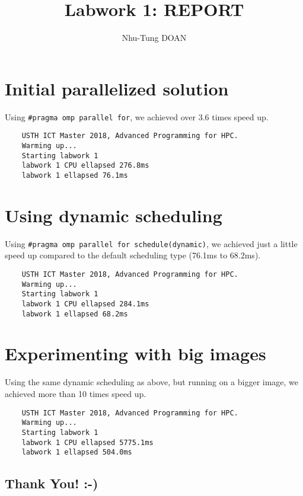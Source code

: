 \documentclass[10pt]{article}
\title {Labwork 1: REPORT}
\author{Nhu-Tung DOAN}
\date{}
\begin{document}
\maketitle

\section{Initial parallelized solution}

Using \verb+#pragma omp parallel for+, we achieved over 3.6 times speed up.

\begin{verbatim}
    USTH ICT Master 2018, Advanced Programming for HPC.
    Warming up...
    Starting labwork 1
    labwork 1 CPU ellapsed 276.8ms
    labwork 1 ellapsed 76.1ms
\end{verbatim}

\section{Using dynamic scheduling}
Using \verb+#pragma omp parallel for schedule(dynamic)+, we achieved just a little speed up compared to the default scheduling type (76.1ms to 68.2ms).

\begin{verbatim}
    USTH ICT Master 2018, Advanced Programming for HPC.
    Warming up...
    Starting labwork 1
    labwork 1 CPU ellapsed 284.1ms
    labwork 1 ellapsed 68.2ms
\end{verbatim}

\section{Experimenting with big images}
Using the same dynamic scheduling as above, but running on a bigger image, we achieved more than 10 times speed up.
\begin{verbatim}
	USTH ICT Master 2018, Advanced Programming for HPC.
	Warming up...
	Starting labwork 1
	labwork 1 CPU ellapsed 5775.1ms
	labwork 1 ellapsed 504.0ms
\end{verbatim}

\subsection*{Thank You! :-)}
\end{document}
